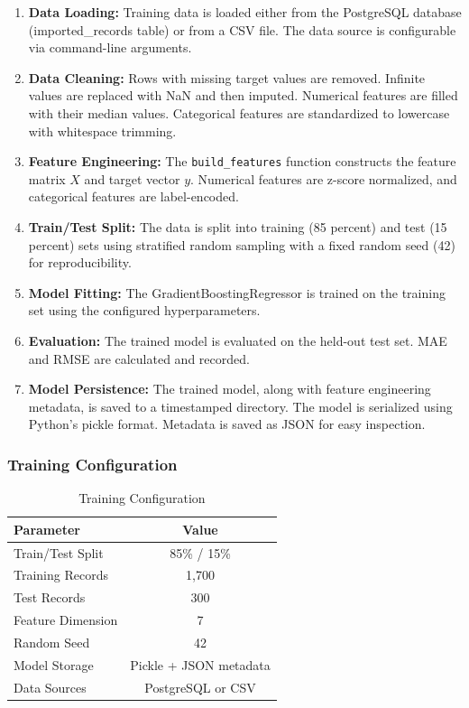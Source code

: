 \begin{enumerate}
  \item \textbf{Data Loading:} Training data is loaded either from the PostgreSQL database (imported\_records table) or from a CSV file. The data source is configurable via command-line arguments.
  
  \item \textbf{Data Cleaning:} Rows with missing target values are removed. Infinite values are replaced with NaN and then imputed. Numerical features are filled with their median values. Categorical features are standardized to lowercase with whitespace trimming.
  
  \item \textbf{Feature Engineering:} The \texttt{build\_features} function constructs the feature matrix \(X\) and target vector \(y\). Numerical features are z-score normalized, and categorical features are label-encoded.
  
  \item \textbf{Train/Test Split:} The data is split into training (85 percent) and test (15 percent) sets using stratified random sampling with a fixed random seed (42) for reproducibility.
  
  \item \textbf{Model Fitting:} The GradientBoostingRegressor is trained on the training set using the configured hyperparameters.
  
  \item \textbf{Evaluation:} The trained model is evaluated on the held-out test set. MAE and RMSE are calculated and recorded.
  
  \item \textbf{Model Persistence:} The trained model, along with feature engineering metadata, is saved to a timestamped directory. The model is serialized using Python's pickle format. Metadata is saved as JSON for easy inspection.
\end{enumerate}

\subsubsection{Training Configuration}

\begin{table}[H]
\centering
\caption{Training Configuration}
\label{tab:training-config}
\begin{tabular}{lc}
\toprule
\textbf{Parameter} & \textbf{Value} \\
\midrule
Train/Test Split & 85\% / 15\% \\
Training Records & 1,700 \\
Test Records & 300 \\
Feature Dimension & 7 \\
Random Seed & 42 \\
Model Storage & Pickle + JSON metadata \\
Data Sources & PostgreSQL or CSV \\
\bottomrule
\end{tabular}
\end{table}

